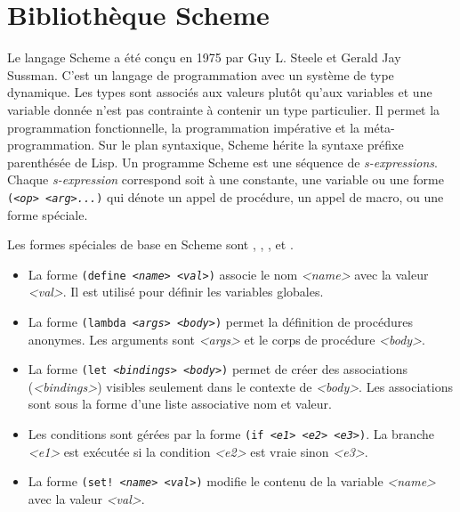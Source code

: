 
\chapter{Bibliothèque Scheme}

Le langage Scheme\cite{Clinger:2008:SCH:1529966.1529973} a été conçu en 1975
par Guy L. Steele et Gerald Jay Sussman.  C'est un langage de programmation
avec un système de type dynamique.  Les types sont associés aux valeurs
plutôt qu'aux variables et une variable donnée n'est pas contrainte
à contenir un type particulier.  Il permet la programmation fonctionnelle,
la programmation impérative et la méta-programmation. Sur le plan syntaxique,
Scheme hérite la syntaxe préfixe parenthésée de Lisp.
Un programme Scheme est
une séquence de
\textit{s-expressions}.  Chaque \textit{s-expression} correspond soit à une
constante, une variable ou une forme \texttt{(\textit{<op>} \textit{<arg>...})}
qui dénote un appel de procédure, un appel de macro, ou une forme spéciale.

Les formes spéciales de base en Scheme sont , ,
,  et .
\begin{itemize}
  \item La forme \texttt{(define \textit{<name>} \textit{<val>})} associe le nom \textit{<name>} avec
    la valeur \textit{<val>}. Il est utilisé pour définir les variables globales.

  \item La forme \texttt{(lambda \textit{<args>} \textit{<body>})} permet la définition de
    procédures anonymes. Les arguments sont \textit{<args>} et le corps
    de procédure \textit{<body>}.

  \item La forme \texttt{(let \textit{<bindings>} \textit{<body>})} permet de créer des
    associations (\textit{<bindings>}) visibles seulement dans le contexte de
    \textit{<body>}. Les associations sont sous la forme d'une liste
    associative nom et valeur.

  \item Les conditions sont gérées par la forme \texttt{(if \textit{<e1>} \textit{<e2>} \textit{<e3>})}.
    La branche \textit{<e1>} est exécutée si la condition \textit{<e2>} est
    vraie sinon \textit{<e3>}.

  \item La forme \texttt{(set! \textit{<name>} \textit{<val>})} modifie le contenu de la variable
    \textit{<name>} avec la valeur \textit{<val>}.
\end{itemize}


